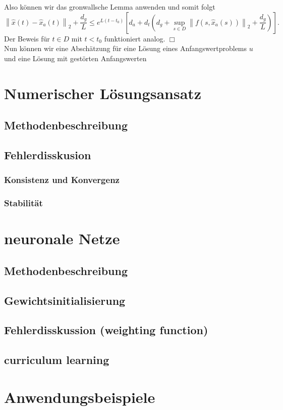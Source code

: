 \documentclass[
    paper=a4, %
    fontsize=12pt,  %
    oneside,        %
    headsepline,    %
    notitlepage     %
]{extarticle}         %
\newcommand{\qedwhite}{\hfill \ensuremath{\Box}}
\begin{document}
    Also können wir das gronwallsche Lemma anwenden und somit folgt
    \[
        \left\lVert \hat{x}(t) - \hat{x}_a(t)\right\rVert_2 + \frac{d_g}{L} \leq
        e^{L(t-t_0)}\left[d_a + d_t(d_g + \sup_{s\in D}\left\lVert f(s,\hat{x}_a(s)) \right\rVert_2 + \frac{d_g}{L})\right].
    \]
    Der Beweis für $t \in D$ mit $t<t_0$ funktioniert analog. \qedwhite\\
    Nun können wir eine Abschätzung für eine Lösung eines Anfangswertproblems $u$ und eine Lösung mit gestörten
    Anfangswerten

    \section{Numerischer Lösungsansatz}
    \subsection{Methodenbeschreibung}
    \subsection{Fehlerdisskusion}
    \subsubsection{Konsistenz und Konvergenz}
    \subsubsection{Stabilität}

    \section{neuronale Netze}
    \subsection{Methodenbeschreibung}
    \subsection{Gewichtsinitialisierung}
    \subsection{Fehlerdisskussion (weighting function)}
    \subsection{curriculum learning}

    \section{Anwendungsbeispiele}

    \newpage
    \printbibliography[heading=bibintoc]
    \newpage
    \listoffigures
\end{document}
